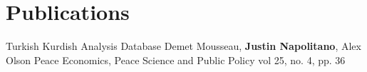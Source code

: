 \documentclass[singlesided, paper=a4, fontsize=10pt]{testing-class}
\begin{document}
{    \vspace{0.4cm}
    \section{Publications} 
    \justinpublication
    {Turkish Kurdish Analysis Database} 
    {Demet Mousseau, \textbf{Justin Napolitano}, Alex Olson} 
    { Peace Economics, Peace Science and Public Policy vol 25, no. 4, pp. 36} 
    {}
}

\makebody
\end{document}
